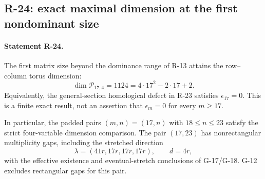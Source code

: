 \subsection{R-24: exact maximal dimension at the first nondominant size}

\paragraph{Statement R-24.}
The first matrix size beyond the dominance range of R-13 attains
the row--column torus dimension:
\begin{equation}\label{R24:exact}
 \dim\mathcal P_{17,4}=1124=4\cdot17^2-2\cdot17+2.
\end{equation}
Equivalently, the general-section homological defect in R-23 satisfies
$\epsilon_{17}=0$. This is a finite exact result, not an assertion
that $\epsilon_m=0$ for every $m\geq17$.

In particular, the padded pairs $(m,n)=(17,n)$ with
$18\leq n\leq23$ satisfy the strict four-variable dimension
comparison. The pair $(17,23)$ has nonrectangular multiplicity gaps,
including the stretched direction
\[
 \lambda=(41r,17r,17r,17r),\qquad d=4r,
\]
with the effective existence and eventual-stretch conclusions of
G-17/G-18. G-12 excludes rectangular gaps for this pair.

